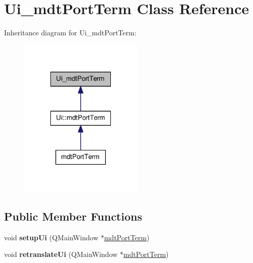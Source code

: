 \hypertarget{class_ui__mdt_port_term}{
\section{Ui\_\-mdtPortTerm Class Reference}
\label{class_ui__mdt_port_term}
}


Inheritance diagram for Ui\_\-mdtPortTerm:\nopagebreak
\begin{figure}[H]
\begin{center}
\leavevmode
\includegraphics[width=168pt]{class_ui__mdt_port_term__inherit__graph}
\end{center}
\end{figure}
\subsection*{Public Member Functions}
\begin{DoxyCompactItemize}
\item 
\hypertarget{class_ui__mdt_port_term_ae97b4a5882faae258e43fc924af070bc}{
void {\bfseries setupUi} (QMainWindow $\ast$\hyperlink{classmdt_port_term}{mdtPortTerm})}
\label{class_ui__mdt_port_term_ae97b4a5882faae258e43fc924af070bc}

\item 
\hypertarget{class_ui__mdt_port_term_a3dd5088c741ecb0fb01d2952e6f9c8a7}{
void {\bfseries retranslateUi} (QMainWindow $\ast$\hyperlink{classmdt_port_term}{mdtPortTerm})}
\label{class_ui__mdt_port_term_a3dd5088c741ecb0fb01d2952e6f9c8a7}

\end{DoxyCompactItemize}
